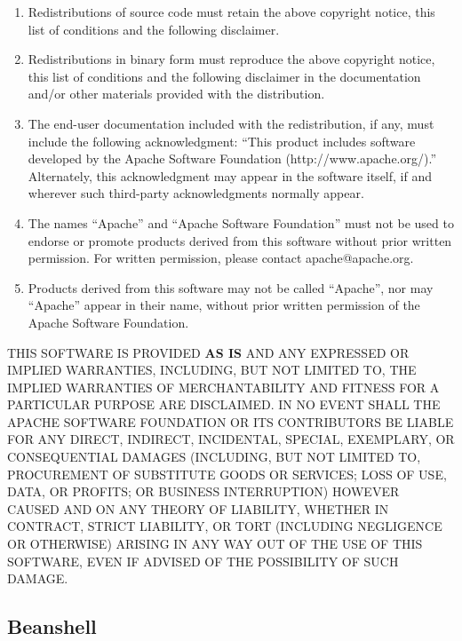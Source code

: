 \begin{enumerate}
	\item Redistributions of source code must retain the above copyright
		notice, this list of conditions and the following disclaimer.

	\item Redistributions in binary form must reproduce the above copyright
		notice, this list of conditions and the following disclaimer in
		the documentation and/or other materials provided with the
		distribution.

	\item The end-user documentation included with the redistribution,
		if any, must include the following acknowledgment:
		``This product includes software developed by the
		Apache Software Foundation (http://www.apache.org/).''
		Alternately, this acknowledgment may appear in the software itself,
		if and wherever such third-party acknowledgments normally appear.

	\item The names ``Apache'' and ``Apache Software Foundation'' 
		must not be used to endorse or promote products
		derived from this software without prior written permission. For
		written permission, please contact apache@apache.org.

	\item Products derived from this software may not be called
	``Apache'', nor may ``Apache'' appear in their name, without
	prior written permission of the Apache Software Foundation.
\end{enumerate}

THIS SOFTWARE IS PROVIDED \textbf{AS IS} AND ANY EXPRESSED OR IMPLIED
WARRANTIES, INCLUDING, BUT NOT LIMITED TO, THE IMPLIED WARRANTIES
OF MERCHANTABILITY AND FITNESS FOR A PARTICULAR PURPOSE ARE
DISCLAIMED.  IN NO EVENT SHALL THE APACHE SOFTWARE FOUNDATION OR
ITS CONTRIBUTORS BE LIABLE FOR ANY DIRECT, INDIRECT, INCIDENTAL,
SPECIAL, EXEMPLARY, OR CONSEQUENTIAL DAMAGES (INCLUDING, BUT NOT
LIMITED TO, PROCUREMENT OF SUBSTITUTE GOODS OR SERVICES; LOSS OF
USE, DATA, OR PROFITS; OR BUSINESS INTERRUPTION) HOWEVER CAUSED AND
ON ANY THEORY OF LIABILITY, WHETHER IN CONTRACT, STRICT LIABILITY,
OR TORT (INCLUDING NEGLIGENCE OR OTHERWISE) ARISING IN ANY WAY OUT
OF THE USE OF THIS SOFTWARE, EVEN IF ADVISED OF THE POSSIBILITY OF
SUCH DAMAGE.

\normalsize

\clearpage

\subsection{Beanshell}

